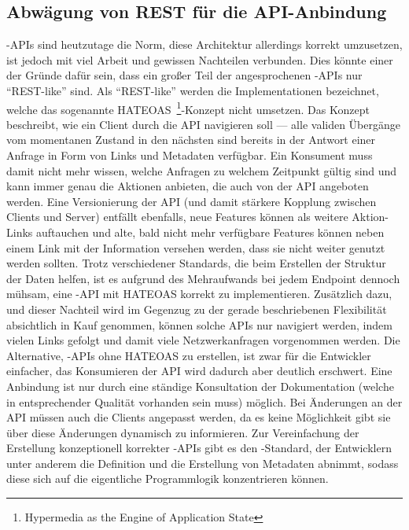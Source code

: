 \subsection{Abwägung von REST für die API-Anbindung}
-APIs sind heutzutage die Norm, diese Architektur allerdings korrekt umzusetzen, ist jedoch mit viel Arbeit und gewissen Nachteilen verbunden. Dies könnte einer der Gründe dafür sein, dass ein großer Teil der angesprochenen -APIs nur \enquote{REST-like} sind. Als \enquote{REST-like} werden die Implementationen bezeichnet, welche das sogenannte HATEOAS~\footnote{Hypermedia as the Engine of Application State}-Konzept nicht umsetzen. Das Konzept beschreibt, wie ein Client durch die API navigieren soll --- alle validen Übergänge vom momentanen Zustand in den nächsten sind bereits in der Antwort einer Anfrage in Form von Links und Metadaten verfügbar. Ein Konsument muss damit nicht mehr wissen, welche Anfragen zu welchem Zeitpunkt gültig sind und kann immer genau die Aktionen anbieten, die auch von der API angeboten werden. Eine Versionierung der API (und damit stärkere Kopplung zwischen Clients und Server) entfällt ebenfalls, neue Features können als weitere Aktion-Links auftauchen und alte, bald nicht mehr verfügbare Features können neben einem Link mit der Information versehen werden, dass sie nicht weiter genutzt werden sollten. Trotz verschiedener Standards, die beim Erstellen der Struktur der Daten helfen, ist es aufgrund des Mehraufwands bei jedem Endpoint dennoch mühsam, eine -API mit HATEOAS korrekt zu implementieren. Zusätzlich dazu, und dieser Nachteil wird im Gegenzug zu der gerade beschriebenen Flexibilität absichtlich in Kauf genommen, können solche APIs nur navigiert werden, indem vielen Links gefolgt und damit viele Netzwerkanfragen vorgenommen werden. 
Die Alternative, -APIs ohne HATEOAS zu erstellen, ist zwar für die Entwickler einfacher, das Konsumieren der API wird dadurch aber deutlich erschwert. Eine Anbindung ist nur durch eine ständige Konsultation der Dokumentation (welche in entsprechender Qualität vorhanden sein muss) möglich. Bei Änderungen an der API müssen auch die Clients angepasst werden, da es keine Möglichkeit gibt sie über diese Änderungen dynamisch zu informieren.
Zur Vereinfachung der Erstellung konzeptionell korrekter -APIs gibt es den -Standard, der Entwicklern unter anderem die Definition und die Erstellung von Metadaten abnimmt, sodass diese sich auf die eigentliche Programmlogik konzentrieren können.

